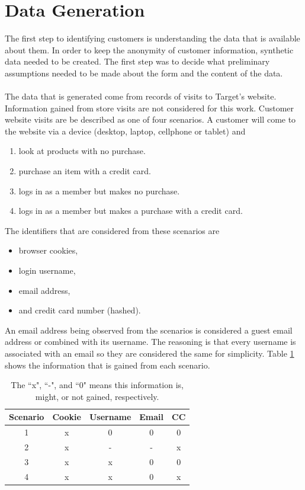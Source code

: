 \documentclass{article}
\theoremstyle{plain}			%
\theoremstyle{definition}		%
\theoremstyle{remark}
\numberwithin{equation}{section}
\numberwithin{figure}{section}
\numberwithin{table}{section}
\begin{document}
\section{Data Generation}
The first step to identifying customers is understanding the data that is available about them. In order to keep the anonymity of customer information, synthetic data needed to be created. The first step was to decide what preliminary assumptions needed to be made about the form and the content of the data.\\
\\
The data that is generated come from records of visits to Target's website. Information gained from store visits are not considered for this work. Customer website visits are be described as one of four scenarios.  A customer will come to the website via a device (desktop, laptop, cellphone or tablet) and
\begin{enumerate}
\item 
look at products with no purchase.  
\item 
purchase an item with a credit card. 
\item 
logs in as a member but makes no purchase.
\item
logs in as a member but makes a purchase with a credit card.
\end{enumerate}
The identifiers that are considered from these scenarios are
\begin{itemize}
\item browser cookies,
\item login username,
\item email address,
\item and credit card number (hashed).
\end{itemize}
An email address being observed from the scenarios is considered a guest email address or combined with its username.  The reasoning is that every username is associated with an email so they are considered the same for simplicity. Table \ref{scenario_tab} shows the information that is gained from each scenario. 
\begin{table}[H]
\centering %
\begin{tabular}{| c | c | c | c | c |} %
\hline %
Scenario & Cookie & Username & Email & CC\\ [0.4ex] %
\hline
1 & x & 0 & 0 & 0\\
2 & x & - & - & x\\
3 & x & x & 0 & 0\\
4 & x & x & 0 & x\\
\hline %
\end{tabular}
\caption{The ``x", ``-", and ``0" means this information is, might, or not gained, respectively.} %
\label{scenario_tab} %
\end{table}
\end{document}
